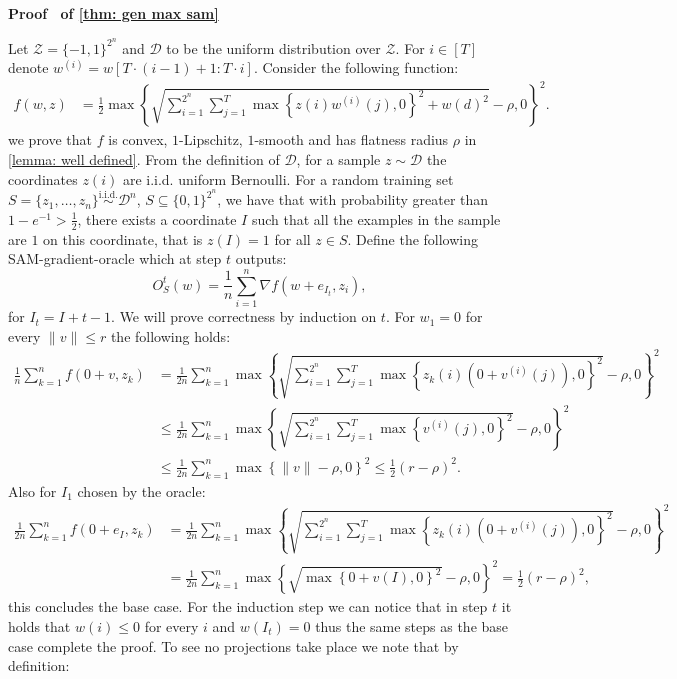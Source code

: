 \documentclass[11pt]{article}
\newcommand{\rad}{r}
\renewenvironment{proof}[1][]{%
  \par\noindent\textbf{\upshape Proof%
  \if\relax\detokenize{#1}\relax\else\ #1\fi}\ %
}{\jmlrQED}
\begin{document}
\begin{proof}[of \cref{thm: gen max sam}]
Let $\mathcal{Z}= \{-1,1\}^{2^n}$ and $\mathcal{D}$ to be the uniform distribution over $\mathcal{Z}$. For $i \in [T]$ denote $w^{(i)} = w[T\cdot (i-1) + 1 : T \cdot i]$. Consider the following function:
\begin{align*}\label{eq: f for sam max with flatness}
    f(w,z) & = \frac{1}{2}\max \left\{\sqrt{\sum_{i=1}^{2^n} \sum_{j=1}^T \max \left\{z(i)w^{(i)}(j),0 \right\}^2 + w(d)^2} - \rho,0 \right\}^2.
\end{align*}
we prove that $f$ is convex, $1$-Lipschitz, $1$-smooth and has flatness radius $\rho$ in \cref{lemma: well defined}. 
From the definition of $\mathcal{D}$, for a sample $z \sim \mathcal{D}$ the coordinates $z(i)$ are i.i.d. uniform Bernoulli. For a random training set $S = \{z_1, \dots, z_n\} \overset{\text{i.i.d.}}{\sim} \mathcal{D}^n$, $S \subseteq \{0,1\}^{2^n}$, we have that with probability greater than $1-e^{-1} > \frac{1}{2}$, there exists a coordinate $I$ such that all the examples in the sample are $1$ on this coordinate, that is $z(I) = 1$ for all $z\in S$. Define the following SAM-gradient-oracle which at step $t$ outputs: 
$$O_S^t(w) = \frac{1}{n} \sum_{i=1}^n \nabla f(w + e_{I_t},z_i),$$
for $I_t = I + t - 1$. We will prove correctness by induction on $t$. For $w_1 = 0$ for every $\|v\| \leq \rad$ the following holds:
\begin{align*}
    \frac{1}{n} \sum_{k=1}^n f(0+v,z_k) &= \frac{1}{2n} \sum_{k=1}^n \max \left\{\sqrt{\sum_{i=1}^{2^n} \sum_{j=1}^T\max \left\{z_k(i) (0 + v^{(i)}(j)),0 \right\}^2} - \rho,0 \right\}^2 \\
    & \leq \frac{1}{2n} \sum_{k=1}^n \max \left\{\sqrt{\sum_{i=1}^{2^n} \sum_{j=1}^T\max \left\{v^{(i)}(j),0 \right\}^2} - \rho,0 \right\}^2 \\
    & \leq \frac{1}{2n} \sum_{k=1}^n \max \left\{\|v\| - \rho,0 \right\}^2 \leq \frac{1}{2}(\rad - \rho)^2.
\end{align*}
Also for $I_1$ chosen by the oracle: 
\begin{align*}
    \frac{1}{2n} \sum_{k=1}^n f(0+e_{I},z_k) & = \frac{1}{2n} \sum_{k=1}^n \max \left\{\sqrt{\sum_{i=1}^{2^n} \sum_{j=1}^T\max \left\{z_k(i) (0 + v^{(i)}(j)),0 \right\}^2} - \rho,0 \right\}^2 \\
    & = \frac{1}{2n} \sum_{k=1}^n \max \left\{\sqrt{\max \left\{0 + v(I),0 \right\}^2} - \rho,0 \right\}^2 = \frac{1}{2}(\rad - \rho)^2,
\end{align*}
this concludes the base case. For the induction step we can notice that in step $t$ it holds that $w(i) \leq 0$ for every $i$ and $w(I_t) = 0$ thus the same steps as the base case complete the proof. To see no projections take place we note that by definition:

\end{proof}
\end{document}
